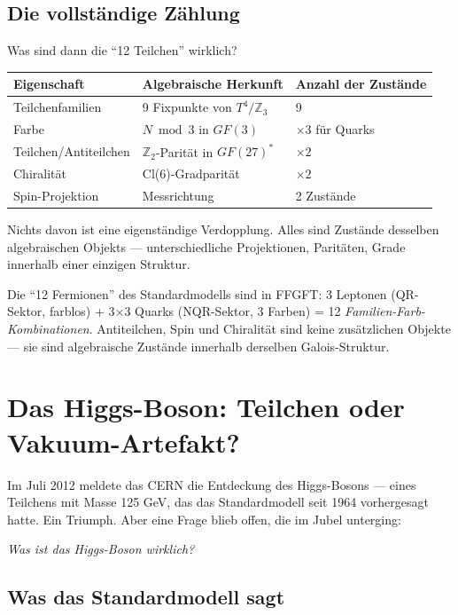 \documentclass[11pt,oneside]{book}
\begin{document}
\section*{Die vollständige Zählung}

Was sind dann die \enquote{12 Teilchen} wirklich?

\begin{center}
\small
\begin{tabular}{lll}
\toprule
Eigenschaft & Algebraische Herkunft & Anzahl der Zustände \\
\midrule
Teilchenfamilien & 9 Fixpunkte von $T^4/\mathbb{Z}_3$ & 9 \\
Farbe & $N \bmod 3$ in $GF(3)$ & $\times 3$ für Quarks \\
Teilchen/Antiteilchen & $\mathbb{Z}_2$-Parität in $GF(27)^*$ & $\times 2$ \\
Chiralität & Cl(6)-Gradparität & $\times 2$ \\
Spin-Projektion & Messrichtung & 2 Zustände \\
\bottomrule
\end{tabular}
\end{center}

Nichts davon ist eine eigenständige Verdopplung. Alles sind Zustände
desselben algebraischen Objekts --- unterschiedliche Projektionen,
Paritäten, Grade innerhalb einer einzigen Struktur.

Die \enquote{12 Fermionen} des Standardmodells sind in FFGFT: 3 Leptonen
(QR-Sektor, farblos) + 3×3 Quarks (NQR-Sektor, 3 Farben) = 12
\textit{Familien-Farb-Kombinationen}. Antiteilchen, Spin und Chiralität
sind keine zusätzlichen Objekte --- sie sind algebraische Zustände
innerhalb derselben Galois-Struktur.

\chapter{Das Higgs-Boson: Teilchen oder Vakuum-Artefakt?}

Im Juli 2012 meldete das CERN die Entdeckung des Higgs-Bosons --- eines
Teilchens mit Masse 125 GeV, das das Standardmodell seit 1964 vorhergesagt
hatte. Ein Triumph. Aber eine Frage blieb offen, die im Jubel unterging:

\textit{Was ist das Higgs-Boson wirklich?}

\section*{Was das Standardmodell sagt}
\end{document}
